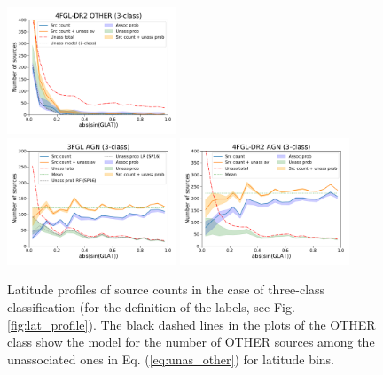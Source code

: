 \documentclass[referee]{aa} %
\begin{document}
\begin{figure}[h]
\includegraphics[width=0.45\textwidth]{plots/lat_profile_OTHER_4FGL-DR2_3classes.pdf} \\ 
\includegraphics[width=0.45\textwidth]{plots/lat_profile_AGN_3FGL_3classes.pdf}
\includegraphics[width=0.45\textwidth]{plots/lat_profile_AGN_4FGL-DR2_3classes.pdf}
\caption{Latitude profiles of source counts in the case of three-class classification (for the definition of the labels, see Fig. \ref{fig:lat_profile}).
The black dashed lines in the plots of the OTHER class show the model for the number of OTHER sources among the unassociated ones
in Eq. (\ref{eq:unas_other}) for latitude bins.}
\label{fig:lat_profile_3class}
\end{figure}
\end{document}
